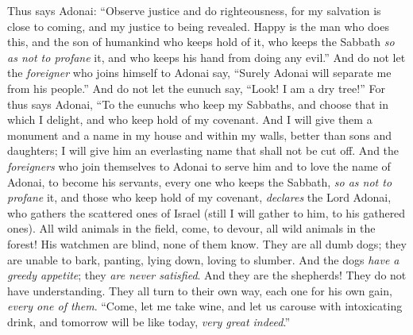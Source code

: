 \begin{biblechapter} %
 Thus says Adonai:
\verse “Observe justice 
and do righteousness, 
for my salvation is close to coming, 
and my justice to being revealed.
\verse Happy is the man who does this, 
and the son of humankind who keeps hold of it, 
who keeps the Sabbath \textit{so as not to profane} it, 
and who keeps his hand from doing any evil.”
\verse And do not let the \textit{foreigner} who joins himself to Adonai say, “Surely Adonai will separate me from his people.” 
And do not let the eunuch say, “Look! I am a dry tree!”
\verse For thus says Adonai, “To the eunuchs who keep my Sabbaths, 
and choose that in which I delight, 
and who keep hold of my covenant.
\verse And I will give them a monument and a name in my house and within my walls, 
better than sons and daughters; 
I will give him an everlasting name 
that shall not be cut off.
\verse And the \textit{foreigners} who join themselves to Adonai to serve him 
and to love the name of Adonai, to become his servants, 
every one who keeps the Sabbath, \textit{so as not to profane} it, 
and those who keep hold of my covenant,
\verse \textit{declares} the Lord Adonai, who gathers the scattered ones of Israel (still I will gather to him, to his gathered ones).
 All wild animals in the field, come, 
to devour, all wild animals in the forest!
\verse His watchmen are blind, 
none of them know. 
They are all dumb dogs; 
they are unable to bark, 
panting, lying down, 
loving to slumber.
\verse And the dogs \textit{have a greedy appetite}; 
they \textit{are never satisfied}. 
And they are the shepherds! 
They do not have understanding. 
They all turn to their own way, 
each one for his own gain, \textit{every one of them}.
\verse “Come, let me take wine, 
and let us carouse with intoxicating drink, 
and tomorrow will be like today, 
\textit{very great indeed}.”
\end{biblechapter}

